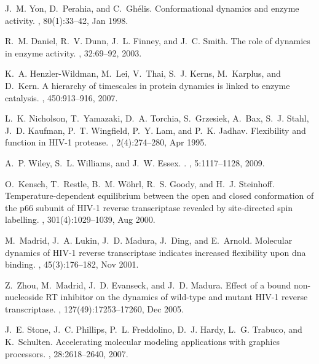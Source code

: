 \begin{thebibliography}{10}
J.~M. Yon, D.~Perahia, and C.~Ghélis.
\newblock Conformational dynamics and enzyme activity.
, 80(1):33--42, Jan 1998.

R.~M. Daniel, R.~V. Dunn, J.~L. Finney, and J.~C. Smith.
\newblock The role of dynamics in enzyme activity.
, 32:69--92, 2003.

K.~A. Henzler-Wildman, M.~Lei, V.~Thai, S.~J. Kerns, M.~Karplus, and D.~Kern.
\newblock A hierarchy of timescales in protein dynamics is linked to enzyme
  catalysis.
, 450:913--916, 2007.

L.~K. Nicholson, T.~Yamazaki, D.~A. Torchia, S.~Grzesiek, A.~Bax, S.~J. Stahl,
  J.~D. Kaufman, P.~T. Wingfield, P.~Y. Lam, and P.~K. Jadhav.
\newblock Flexibility and function in {HIV-1} protease.
, 2(4):274--280, Apr 1995.

A.~P. Wiley, S.~L. Williams, and J.~W. Essex.
.
, 5:1117--1128, 2009.

O.~Kensch, T.~Restle, B.~M. Wöhrl, R.~S. Goody, and H.~J. Steinhoff.
\newblock Temperature-dependent equilibrium between the open and closed
  conformation of the p66 subunit of {HIV-1} reverse transcriptase revealed by
  site-directed spin labelling.
, 301(4):1029--1039, Aug 2000.

M.~Madrid, J.~A. Lukin, J.~D. Madura, J.~Ding, and E.~Arnold.
\newblock Molecular dynamics of {HIV-1} reverse transcriptase indicates
  increased flexibility upon dna binding.
, 45(3):176--182, Nov 2001.

Z.~Zhou, M.~Madrid, J.~D. Evanseck, and J.~D. Madura.
\newblock Effect of a bound non-nucleoside {RT} inhibitor on the dynamics of
  wild-type and mutant {HIV-1} reverse transcriptase.
, 127(49):17253--17260, Dec 2005.

J.~E. Stone, J.~C. Phillips, P.~L. Freddolino, D.~J. Hardy, L.~G. Trabuco, and
  K.~Schulten.
\newblock Accelerating molecular modeling applications with graphics
  processors.
, 28:2618--2640, 2007.


\end{thebibliography}
